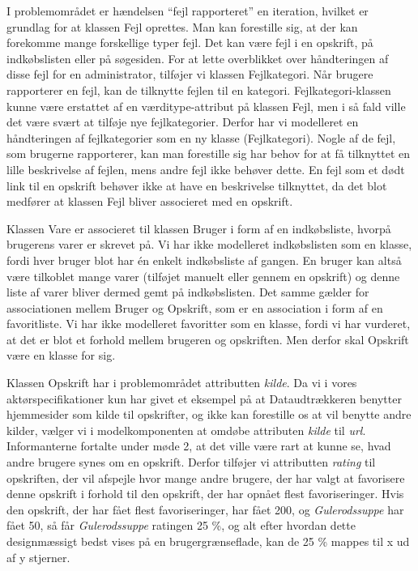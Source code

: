 I problemområdet er hændelsen ``fejl rapporteret'' en iteration, hvilket er grundlag for at klassen Fejl oprettes. Man kan forestille sig, at der kan forekomme mange forskellige typer fejl. Det kan være fejl i en opskrift, på indkøbslisten eller på søgesiden. For at lette overblikket over håndteringen af disse fejl for en administrator, tilføjer vi klassen Fejlkategori. Når brugere rapporterer en fejl, kan de tilknytte fejlen til en kategori. Fejlkategori-klassen kunne være erstattet af en værditype-attribut på klassen Fejl, men i så fald ville det være svært at tilføje nye fejlkategorier. Derfor har vi modelleret en håndteringen af fejlkategorier som en ny klasse (Fejlkategori). Nogle af de fejl, som brugerne rapporterer, kan man forestille sig har behov for at få tilknyttet en lille beskrivelse af fejlen, mens andre fejl ikke behøver dette. En fejl som \fx et dødt link til en opskrift behøver ikke at have en beskrivelse tilknyttet, da det blot medfører at klassen Fejl bliver associeret med en opskrift.

Klassen Vare er associeret til klassen Bruger i form af en indkøbsliste, hvorpå brugerens varer er skrevet på. Vi har ikke modelleret indkøbslisten som en klasse, fordi hver bruger blot har én enkelt indkøbsliste af gangen. En bruger kan altså være tilkoblet mange varer (tilføjet manuelt eller gennem en opskrift) og denne liste af varer bliver dermed gemt på indkøbslisten. Det samme gælder for associationen mellem Bruger og Opskrift, som er en association i form af en favoritliste. Vi har ikke modelleret favoritter som en klasse, fordi vi har vurderet, at det er blot et forhold mellem brugeren og opskriften. Men derfor skal Opskrift være en klasse for sig.

Klassen Opskrift har i problemområdet attributten \textit{kilde}. Da vi i vores aktørspecifikationer kun har givet et eksempel på at Dataudtrækkeren benytter hjemmesider som kilde til opskrifter, og ikke kan forestille os at \Foodl{} vil benytte andre kilder, vælger vi i modelkomponenten at omdøbe attributen \textit{kilde} til \textit{url}. Informanterne fortalte under møde 2, at det ville være rart at kunne se, hvad andre brugere synes om en opskrift. Derfor tilføjer vi attributten \textit{rating} til opskriften, der vil afspejle hvor mange andre brugere, der har valgt at favorisere denne opskrift i forhold til den opskrift, der har opnået flest favoriseringer. Hvis den opskrift, der har fået flest favoriseringer, har fået 200, og \textit{Gulerodssuppe} har fået 50, så får \textit{Gulerodssuppe} ratingen 25 \%, og alt efter hvordan dette designmæssigt bedst vises på en brugergrænseflade, kan de 25 \% mappes til \fx x ud af y stjerner.

